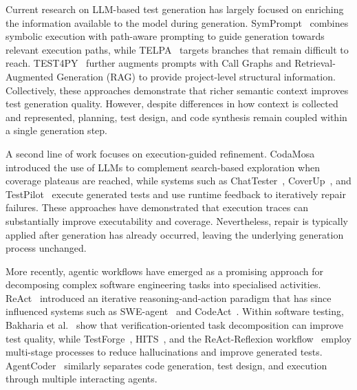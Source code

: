 \documentclass{llncs}
\begin{document}
Current research on LLM-based test generation has largely focused on enriching the information available to the model during generation. SymPrompt~\cite{ryan2024code} combines symbolic execution with path-aware prompting to guide generation towards relevant execution paths, while TELPA~\cite{yang2024telpa} targets branches that remain difficult to reach. TEST4PY~\cite{test4py2025} further augments prompts with Call Graphs and Retrieval-Augmented Generation (RAG) to provide project-level structural information. Collectively, these approaches demonstrate that richer semantic context improves test generation quality. However, despite differences in how context is collected and represented, planning, test design, and code synthesis remain coupled within a single generation step.

A second line of work focuses on execution-guided refinement. CodaMosa~\cite{lemieux2023codamosa} introduced the use of LLMs to complement search-based exploration when coverage plateaus are reached, while systems such as ChatTester~\cite{yuan2023no}, CoverUp~\cite{altmayer2025coverup}, and TestPilot~\cite{schafer2024empirical} execute generated tests and use runtime feedback to iteratively repair failures. These approaches have demonstrated that execution traces can substantially improve executability and coverage. Nevertheless, repair is typically applied after generation has already occurred, leaving the underlying generation process unchanged.

More recently, agentic workflows have emerged as a promising approach for decomposing complex software engineering tasks into specialised activities. ReAct~\cite{yao2022react} introduced an iterative reasoning-and-action paradigm that has since influenced systems such as SWE-agent~\cite{yang2024swe} and CodeAct~\cite{wang2024executable}. Within software testing, Bakharia et al.~\cite{bakharia2025iterative} show that verification-oriented task decomposition can improve test quality, while TestForge~\cite{jain2025testforge}, HITS~\cite{wang2024hits}, and the ReAct-Reflexion workflow~\cite{ubaidillah2025react} employ multi-stage processes to reduce hallucinations and improve generated tests. AgentCoder~\cite{huang2024agentcoder} similarly separates code generation, test design, and execution through multiple interacting agents.
\end{document}

